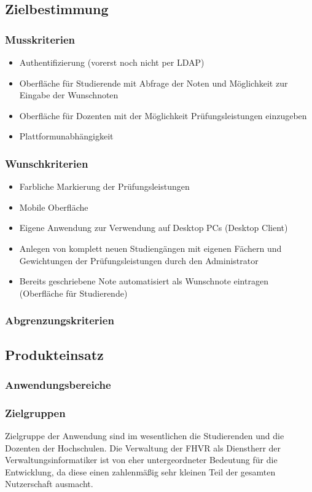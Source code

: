 \documentclass[12pt,a4paper,parskip]{scrreprt}
\begin{document}
\subsection{Zielbestimmung}
\subsubsection{Musskriterien}
\begin{itemize}
\item Authentifizierung (vorerst noch nicht per LDAP)
\item Oberfläche für Studierende mit Abfrage der Noten und Möglichkeit zur Eingabe der Wunschnoten
\item Oberfläche für Dozenten mit der Möglichkeit Prüfungsleistungen einzugeben
\item Plattformunabhängigkeit
\end{itemize}
\subsubsection{Wunschkriterien}
\begin{itemize}
\item Farbliche Markierung der Prüfungsleistungen
\item Mobile Oberfläche
\item Eigene Anwendung zur Verwendung auf Desktop PCs (Desktop Client)
\item Anlegen von komplett neuen Studiengängen mit eigenen Fächern und Gewichtungen der Prüfungsleistungen durch den Administrator
\item Bereits geschriebene Note automatisiert als Wunschnote eintragen (Oberfläche für Studierende)
\end{itemize}
\subsubsection{Abgrenzungskriterien}
\subsection{Produkteinsatz}
\subsubsection{Anwendungsbereiche}
\subsubsection{Zielgruppen}
Zielgruppe der Anwendung sind im wesentlichen die Studierenden und die Dozenten der Hochschulen. Die Verwaltung der FHVR als Dienstherr der Verwaltungsinformatiker ist von eher untergeordneter Bedeutung für die Entwicklung, da diese einen zahlenmäßig sehr kleinen Teil der gesamten Nutzerschaft ausmacht.
\end{document}
